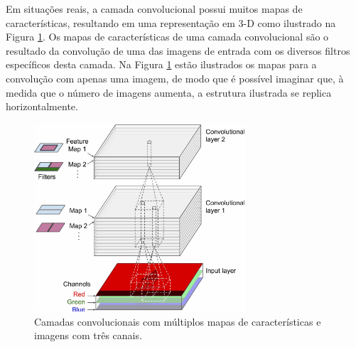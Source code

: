 Em situações reais, a camada convolucional possui muitos mapas de características, resultando
em uma representação em 3-D como ilustrado na Figura \ref{fig:featmaps}. Os mapas de características
de uma camada convolucional são o resultado da convolução de uma das imagens de entrada com os diversos
filtros específicos desta camada. Na Figura \ref{fig:featmaps} estão ilustrados os mapas para a convolução
com apenas uma imagem, de modo que é possível imaginar que, à medida que o número de imagens aumenta,
a estrutura ilustrada se replica horizontalmente. 
\begin{figure}[htp]
\begin{center}
  \includegraphics[width=0.7\textwidth]{fig/feat_maps}
  \caption{Camadas convolucionais com múltiplos mapas de características e imagens com três canais.}
  \label{fig:featmaps}
\end{center}
\end{figure}

